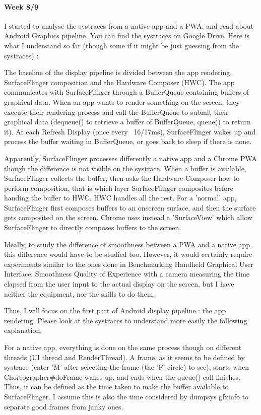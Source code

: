 \documentclass{kththesis}
\begin{document}
\paragraph{Week 8/9}
I started to analyse the systraces from a native app and a PWA, and read about Android Graphics pipeline. You can find the systraces on Google Drive. Here is what I understand so far (though some if it might be just guessing from the systraces) : 

The baseline of the display pipeline is divided between the app rendering, SurfaceFlinger composition and the Hardware Composer (HWC). The app communicates with SurfaceFlinger through a BufferQueue containing buffers of graphical data. When an app wants to render something on the screen, they execute their rendering process and call the BufferQueue to submit their graphical data (dequeue() to retrieve a buffer of BufferQueue, queue() to return it). At each Refresh Display (once every ~16/17ms), SurfaceFlinger wakes up and process the buffer waiting in BufferQueue, or goes back to sleep if there is none. 

Apparently, SurfaceFlinger processes differently a native app and a Chrome PWA though the difference is not visible on the systrace. When a buffer is available, SurfaceFlinger collects the buffer, then asks the Hardware Composer how to perform composition, that is which layer SurfaceFlinger composites before handing the buffer to HWC. HWC handles all the rest. For a 'normal' app, SurfaceFlinger first composes buffers to an onscreen surface, and then the surface gets composited on the screen. Chrome uses instead a 'SurfaceView' which allow SurfaceFlinger to directly composes buffers to the screen.

Ideally, to study the difference of smoothness between a PWA and a native app, this difference would have to be studied too. However, it would certainly require experiments similar to the ones done in Benchmarking Handheld Graphical User Interface: Smoothness Quality of Experience    with a camera measuring the time elapsed from the user input to the actual display on the screen, but I have neither the equipment, nor the skills to do them. 

Thus, I will focus on the first part of Android display pipeline : the app rendering. Please look at the systraces to understand more easily the following explanation.

For a native app, everything is done on the same process though on different threads (UI thread and RenderThread). A frame, as it seems to be defined by systrace (enter 'M' after selecting the frame (the 'F' circle) to see), starts when Choreographer{\#}doFrame wakes up, and ends when the queue() call finishes. Thus, it can be defined as the time taken to make the buffer available to SurfaceFlinger. I assume this is also the time considered by dumpsys gfxinfo to separate good frames from janky ones.
\end{document}

